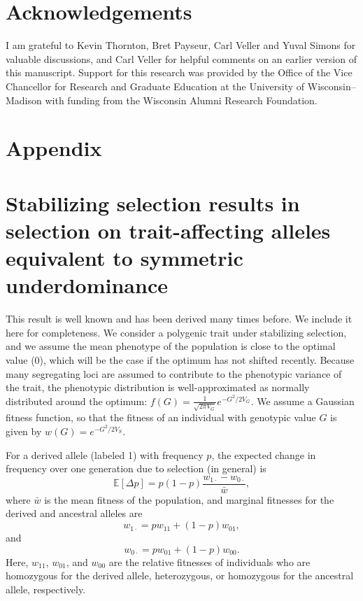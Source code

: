 \documentclass{article}
\newcommand{\E}{\mathbb{E}}
\begin{document}
\section*{Acknowledgements}

I am grateful to Kevin Thornton, Bret Payseur, Carl Veller and Yuval Simons for
valuable discussions, and Carl Veller for helpful comments on an earlier
version of this manuscript. Support for this research was provided by the
Office of the Vice Chancellor for Research and Graduate Education at the
University of Wisconsin–Madison with funding from the Wisconsin Alumni Research
Foundation.




\appendix
\section*{Appendix}

\section{Stabilizing selection results in selection on trait-affecting alleles
equivalent to symmetric underdominance} \label{sec:underdominance}

This result is well known and has been derived many times before. We include it
here for completeness. We consider a polygenic trait under stabilizing
selection, and we assume the mean phenotype of the population is close to the
optimal value (0), which will be the case if the optimum has not shifted
recently. Because many segregating loci are assumed to contribute to the
phenotypic variance of the trait, the phenotypic distribution is
well-approximated as normally distributed around the optimum:
\(f(G)=\frac{1}{\sqrt{2\pi V_G}} e^{-G^2/2V_G}\). We assume a Gaussian fitness
function, so that the fitness of an individual with genotypic value $G$ is
given by \(w(G)=e^{-G^2/2V_S}\).

For a derived allele (labeled 1) with frequency $p$, the expected change in
frequency over one generation due to selection (in general) is
\[\E[\Delta p]=p(1-p)\frac{w_{1\cdot}-w_{0\cdot}}{\bar{w}},\]
where \(\bar{w}\) is the mean fitness of the population, and marginal fitnesses
for the derived and ancestral alleles are
\[w_{1\cdot}=p w_{11} + (1-p)w_{01},\]
and
\[w_{0\cdot}=p w_{01} + (1-p)w_{00}.\]
Here, $w_{11}$, $w_{01}$, and $w_{00}$ are the relative fitnesses of
individuals who are homozygous for the derived allele, heterozygous, or
homozygous for the ancestral allele, respectively.
\end{document}
